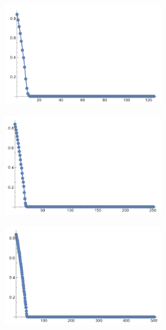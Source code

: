 \documentclass[12pt, a4paper]{article}
\begin{document}
	\begin{figure}[H]
		\centering
		\begin{subfigure}{.5\textwidth}
			\centering
			\includegraphics[width=0.75\textwidth]{test3-01}
		\end{subfigure}%
		\begin{subfigure}{.5\textwidth}
			\centering
			\includegraphics[width=0.75\textwidth]{test3-05}
		\end{subfigure}
		\begin{subfigure}{.5\textwidth}
			\centering
			\includegraphics[width=0.75\textwidth]{test3-075}
		\end{subfigure}%
		\begin{subfigure}{.5\textwidth}

\end{subfigure}
\end{figure}
\end{document}
